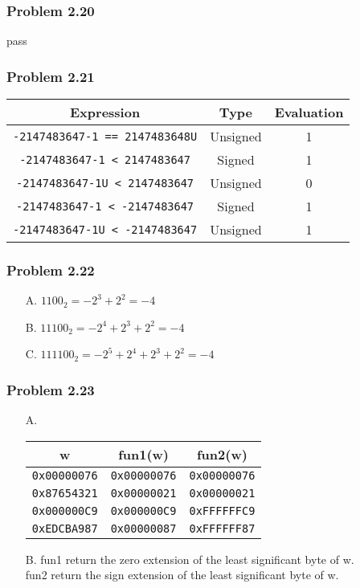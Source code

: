 \documentclass[a4paper]{article}
\begin{document}
\subsubsection*{Problem 2.20}
pass

\subsubsection*{Problem 2.21}
\begin{tabular}{ccc}
    Expression&Type&Evaluation\\
    \hline
    \tt{-2147483647-1 == 2147483648U}&Unsigned&1\\
    \tt{-2147483647-1 < 2147483647}&Signed&1\\
    \tt{-2147483647-1U < 2147483647}&Unsigned&0\\
    \tt{-2147483647-1 < -2147483647}&Signed&1\\
    \tt{-2147483647-1U < -2147483647}&Unsigned&1
    
\end{tabular}

\subsubsection*{Problem 2.22}
\begin{enumerate}
    \item [A.] $1100_2=-2^3+2^2=-4$
    \item [B.] $11100_2=-2^4+2^3+2^2=-4$
    \item [C.] $111100_2=-2^5+2^4+2^3+2^2=-4$
\end{enumerate}

\subsubsection*{Problem 2.23}
\begin{enumerate}
    \item [A.]\begin{tabular}{c|c|c}
            w&fun1(w)&fun2(w)\\
            \hline
            \tt{0x00000076}&\tt{0x00000076}&\tt{0x00000076}\\
            \tt{0x87654321}&\tt{0x00000021}&\tt{0x00000021}\\
            \tt{0x000000C9}&\tt{0x000000C9}&\tt{0xFFFFFFC9}\\
            \tt{0xEDCBA987}&\tt{0x00000087}&\tt{0xFFFFFF87}\\
          \end{tabular}
    \item [B.] fun1 return the zero extension of the least significant byte of w.\\
               fun2 return the sign extension of the least significant byte of w.
\end{enumerate}
\end{document}
